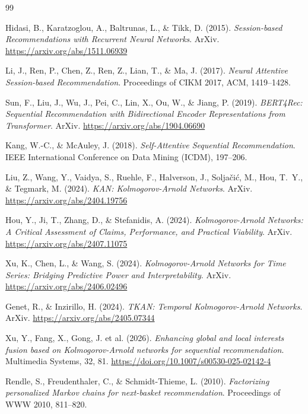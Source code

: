 \documentclass[12pt,a4paper]{report}
\begin{document}
\begin{thebibliography}{99}

Hidasi, B., Karatzoglou, A., Baltrunas, L., \& Tikk, D. (2015).
\textit{Session-based Recommendations with Recurrent Neural Networks}.
ArXiv. \url{https://arxiv.org/abs/1511.06939}

Li, J., Ren, P., Chen, Z., Ren, Z., Lian, T., \& Ma, J. (2017).
\textit{Neural Attentive Session-based Recommendation}.
Proceedings of CIKM 2017, ACM, 1419--1428.

Sun, F., Liu, J., Wu, J., Pei, C., Lin, X., Ou, W., \& Jiang, P. (2019).
\textit{BERT4Rec: Sequential Recommendation with Bidirectional Encoder
Representations from Transformer}.
ArXiv. \url{https://arxiv.org/abs/1904.06690}

Kang, W.-C., \& McAuley, J. (2018).
\textit{Self-Attentive Sequential Recommendation}.
IEEE International Conference on Data Mining (ICDM), 197--206.

Liu, Z., Wang, Y., Vaidya, S., Ruehle, F., Halverson, J., Soljačić, M.,
Hou, T.~Y., \& Tegmark, M. (2024).
\textit{KAN: Kolmogorov-Arnold Networks}.
ArXiv. \url{https://arxiv.org/abs/2404.19756}

Hou, Y., Ji, T., Zhang, D., \& Stefanidis, A. (2024).
\textit{Kolmogorov-Arnold Networks: A Critical Assessment of Claims,
Performance, and Practical Viability}.
ArXiv. \url{https://arxiv.org/abs/2407.11075}

Xu, K., Chen, L., \& Wang, S. (2024).
\textit{Kolmogorov-Arnold Networks for Time Series: Bridging Predictive Power
and Interpretability}.
ArXiv. \url{https://arxiv.org/abs/2406.02496}

Genet, R., \& Inzirillo, H. (2024).
\textit{TKAN: Temporal Kolmogorov-Arnold Networks}.
ArXiv. \url{https://arxiv.org/abs/2405.07344}

Xu, Y., Fang, X., Gong, J. et al. (2026).
\textit{Enhancing global and local interests fusion based on
Kolmogorov-Arnold networks for sequential recommendation}.
Multimedia Systems, 32, 81.
\url{https://doi.org/10.1007/s00530-025-02142-4}

Rendle, S., Freudenthaler, C., \& Schmidt-Thieme, L. (2010).
\textit{Factorizing personalized Markov chains for next-basket recommendation}.
Proceedings of WWW 2010, 811--820.

\end{thebibliography}
\end{document}

